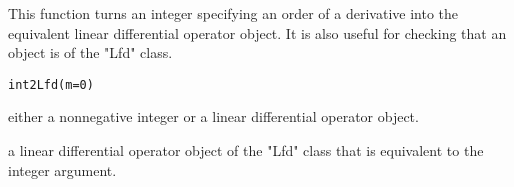 \begin{Description}\relax
This function turns an integer specifying an order of a derivative into the
equivalent linear differential operator object.  It is also useful for
checking that an object is of the "Lfd" class.
\end{Description}
\begin{Usage}
\begin{verbatim}
int2Lfd(m=0)
\end{verbatim}
\end{Usage}
\begin{Arguments}
\begin{ldescription}
\item[\code{m}] either a nonnegative integer or a linear differential operator object.

\end{ldescription}
\end{Arguments}
\begin{Value}
a linear differential operator object of the "Lfd" class that is
equivalent to the integer argument.
\end{Value}

